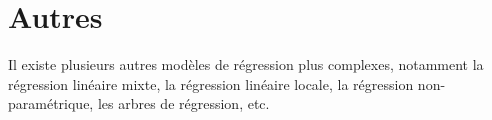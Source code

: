 
\section{Autres}

Il existe plusieurs autres modèles de régression plus complexes, notamment la régression linéaire mixte, la régression linéaire locale, la régression non-paramétrique, les arbres de régression, etc. 